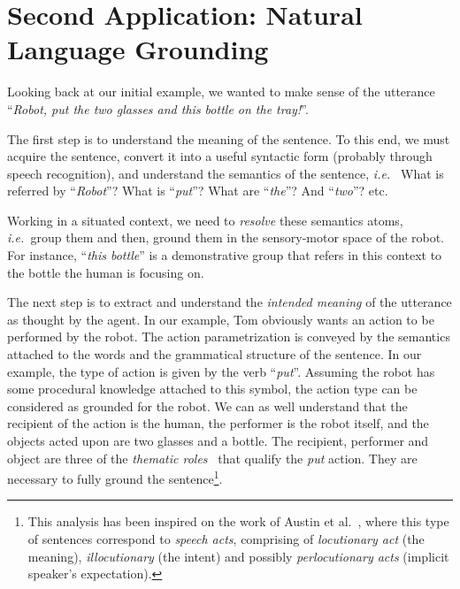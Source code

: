 \documentclass{svmult}
\newcommand{\ie}{{\textit{i.e.~}}}
\begin{document}

\section{Second Application: Natural Language Grounding}
\label{dialogs}

Looking back at our initial example, we wanted to make sense of the utterance
``\emph{Robot, put the two glasses and this bottle on the tray!}''.

The first step is to understand the meaning of the sentence. To this end, we
must acquire the sentence, convert it into a useful syntactic form (probably
through speech recognition), and understand the semantics of the sentence, \ie
What is referred by ``\textit{Robot}''? What is ``\textit{put}''? What are
``\textit{the}''? And ``\textit{two}''? etc.

Working in a situated context, we need to \emph{resolve} these semantics atoms,
\ie group them and then, ground them in the sensory-motor space of the robot. For instance,
``\textit{this bottle}'' is a demonstrative group that refers in this context to the
bottle the human is focusing on.

The next step is to extract and understand the \emph{intended meaning} of the
utterance as thought by the agent. In our example, Tom obviously wants an
action to be performed by the robot. The action parametrization is conveyed by
the semantics attached to the words and the grammatical structure of the
sentence. In our example, the type of action is given by the verb
``\textit{put}''. Assuming the robot has some procedural knowledge attached to
this symbol, the action type can be considered as grounded for the robot. We
can as well understand that the recipient of the action is the human, the
performer is the robot itself, and the objects acted upon are two glasses and a bottle. The
recipient, performer and object are three of the \emph{thematic
roles}~\cite{Gruber1965} that qualify the \emph{put} action. They are
necessary to fully ground the sentence\footnote{This analysis has been inspired
on the work of Austin et al.~\cite{Austin1962}, where this type of sentences
correspond to \emph{speech acts}, comprising of \emph{locutionary act} (the
meaning), \emph{illocutionary} (the intent) and possibly \emph{perlocutionary
acts} (implicit speaker's expectation).}.
\end{document}
